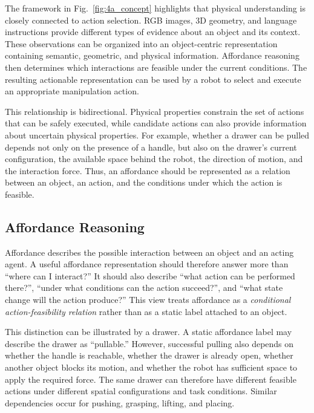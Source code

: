 \documentclass{SCIS2026}
\begin{document}
The framework in Fig.~\ref{fig:4a_concept} highlights that physical
understanding is closely connected to action selection. RGB images, 3D
geometry, and language instructions provide different types of evidence
about an object and its context. These observations can be organized into
an object-centric representation containing semantic, geometric, and
physical information. Affordance reasoning then determines which
interactions are feasible under the current conditions. The resulting
actionable representation can be used by a robot to select and execute an
appropriate manipulation action.

This relationship is bidirectional. Physical properties constrain the set of
actions that can be safely executed, while candidate actions can also provide
information about uncertain physical properties. For example, whether a
drawer can be pulled depends not only on the presence of a handle, but also
on the drawer's current configuration, the available space behind the robot,
the direction of motion, and the interaction force. Thus, an affordance
should be represented as a relation between an object, an action, and the
conditions under which the action is feasible.



\subsection{Affordance Reasoning}

Affordance describes the possible interaction between an object and an
acting agent. A useful affordance representation should therefore answer
more than ``where can I interact?'' It should also describe ``what action
can be performed there?'', ``under what conditions can the action succeed?'',
and ``what state change will the action produce?'' This view treats
affordance as a \emph{conditional action-feasibility relation} rather than
as a static label attached to an object.

This distinction can be illustrated by a drawer. A static affordance label
may describe the drawer as ``pullable.'' However, successful pulling also
depends on whether the handle is reachable, whether the drawer is already
open, whether another object blocks its motion, and whether the robot has
sufficient space to apply the required force. The same drawer can therefore
have different feasible actions under different spatial configurations and
task conditions. Similar dependencies occur for pushing, grasping, lifting,
and placing.
\end{document}
